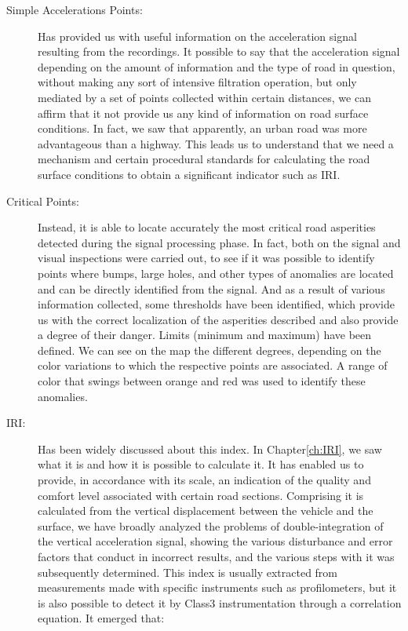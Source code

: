 \documentclass[tesi]{subfiles}
\begin{document}
\begin{description}
\item[Simple Accelerations Points:] Has provided us with useful information on the acceleration signal resulting from the recordings. It possible to say that the acceleration signal depending on the amount of information and the type of road in question, without making any sort of intensive filtration operation, but only mediated by a set of points collected within certain distances, we can affirm that it not provide us any kind of information on road surface conditions. In fact, we saw that apparently, an urban road was more advantageous than a highway. This leads us to understand that we need a mechanism and certain procedural standards for calculating the road surface conditions to obtain a significant indicator such as IRI.
\item[Critical Points:] Instead, it is able to locate accurately the most critical road asperities detected during the signal processing phase. In fact, both on the signal and visual inspections were carried out, to see if it was possible to identify points where bumps, large holes, and other types of anomalies are located and can be directly identified from the signal. And as a result of various information collected, some thresholds have been identified, which provide us with the correct localization of the asperities described and also provide a degree of their danger. Limits (minimum and maximum) have been defined. We can see on the map the different degrees, depending on the color variations to which the respective points are associated. A range of color that swings between orange and red was used to identify these anomalies.
\item[IRI:] Has been widely discussed about this index. In Chapter\ref{ch:IRI}, we saw what it is and how it is possible to calculate it.
It has enabled us to provide, in accordance with its scale, an indication of the quality and comfort level associated with certain road sections. Comprising it is calculated from the vertical displacement between the vehicle and the surface, we have broadly analyzed the problems of double-integration of the vertical acceleration signal, showing the various disturbance and error factors that conduct in incorrect results, and the various steps with it was subsequently determined. This index is usually extracted from measurements made with specific instruments such as profilometers, but it is also possible to detect it by Class3 instrumentation through a correlation equation. It emerged that:
\begin{itemize}

\end{itemize}
\end{description}
\end{document}

